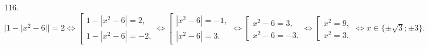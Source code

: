 116. $|1-|x^2-6||=2\Leftrightarrow \left[\begin{array}{l}1-|x^2-6|=2,\\ 1-|x^2-6|=-2.\end{array}\right. \Leftrightarrow \left[\begin{array}{l}|x^2-6|=-1,\\ |x^2-6|=3.\end{array}\right.\Leftrightarrow \left[\begin{array}{l}x^2-6=3,\\ x^2-6=-3.\end{array}\right.\Leftrightarrow \left[\begin{array}{l}x^2=9,\\ x^2=3.\end{array}\right.\Leftrightarrow x\in\{\pm\sqrt{3};\pm3\}.$\\
